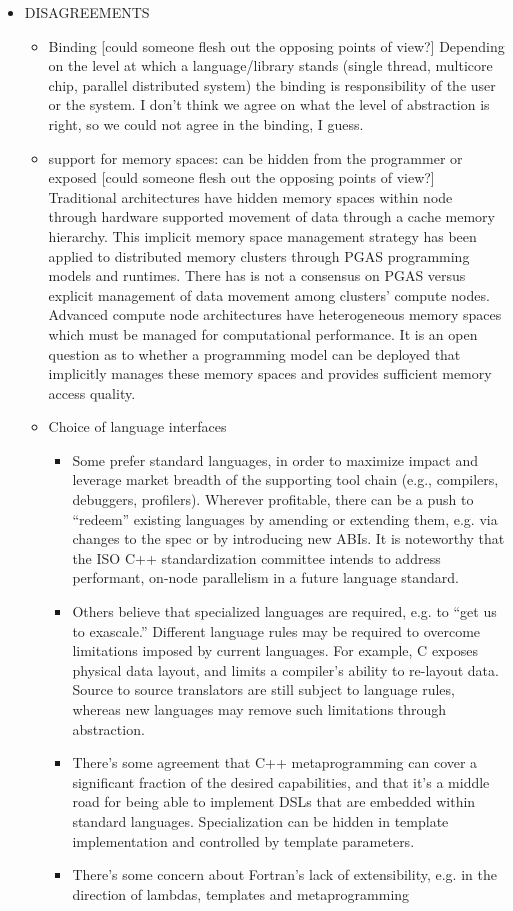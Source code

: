 \begin{itemize}
\item  DISAGREEMENTS
  \begin{itemize}
  \item Binding [could someone flesh out the opposing points of view?] Depending on the level at which a language/library stands (single thread, multicore chip, parallel distributed system) the binding is responsibility of the user or the system. I don't think we agree on what the level of abstraction is right, so we could not agree in the binding, I guess.
  \item support for memory spaces: can be hidden from the programmer or exposed [could someone flesh out the opposing points of view?]  Traditional architectures have hidden memory spaces within node through hardware supported movement of data through a cache memory hierarchy.  This implicit memory space management strategy has been applied to distributed memory clusters through PGAS programming models and runtimes.  There has is not a consensus on PGAS versus explicit management of data movement among clusters' compute nodes.  Advanced compute node architectures have heterogeneous memory spaces which must be managed for computational performance.  It is an open question as to whether a programming model can be deployed that implicitly manages these memory spaces and provides sufficient memory access quality.

  \item Choice of language interfaces
    \begin{itemize}
    \item Some prefer standard languages, in order to maximize impact and leverage market breadth of the supporting tool chain (e.g., compilers, debuggers, profilers).  Wherever profitable, there can be a push to ``redeem'' existing languages by amending or extending them, e.g. via changes to the spec or by introducing new ABIs.  It is noteworthy that the ISO C++ standardization committee intends to address performant, on-node parallelism in a future language standard.
    \item Others believe that specialized languages are required, e.g. to ``get us to exascale.''  Different language rules may be required to overcome limitations imposed by current languages.  For example, C exposes physical data layout, and limits a compiler's ability to re-layout data.  Source to source translators are still subject to language rules, whereas new languages may remove such limitations through abstraction.
    \item There's some agreement that C++ metaprogramming can cover a significant fraction of the desired capabilities, and that it's a middle road for being able to implement DSLs that are embedded within standard languages.  Specialization can be hidden in template implementation and controlled by template parameters.
    \item There's some concern about Fortran's lack of extensibility, e.g. in the direction of lambdas, templates and metaprogramming
    \end{itemize}
  \end{itemize}


\end{itemize}
